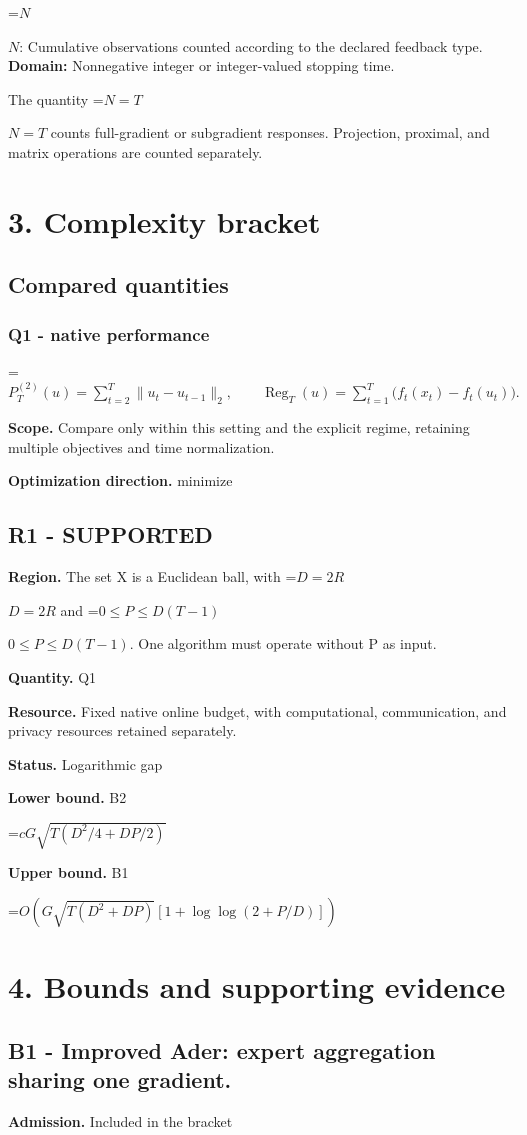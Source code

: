 \documentclass[10pt,a4paper]{article}
\newcommand{\AtlasMath}[1]{\par\begingroup\centering\setbox0=\hbox{$\displaystyle #1$}\ifdim\wd0>1.4\linewidth\typeout{ATLAS WIDE FORMULA: \the\wd0}\fi\ifdim\wd0>\linewidth\resizebox{\linewidth}{!}{\box0}\else\box0\fi\par\endgroup}
\newcommand{\AtlasInlineMath}[1]{\begingroup\setbox0=\hbox{$#1$}\ifdim\wd0>.4\linewidth\endgroup\AtlasMath{#1}\else\endgroup$#1$\fi}
\begin{document}
\AtlasInlineMath{N}: Cumulative observations counted according to the declared feedback type. \textbf{Domain:} Nonnegative integer or integer-valued stopping time.

The quantity \AtlasInlineMath{N=T} counts full-gradient or subgradient responses. Projection, proximal, and matrix operations are counted separately.

\section{3. Complexity bracket}
\subsection{Compared quantities}
\subsubsection{Q1 - native performance}
\AtlasMath{P_T^{(2)}(u)=\sum_{t=2}^{T}\|u_t-u_{t-1}\|_2,\qquad \operatorname{Reg}_T(u)=\sum_{t=1}^{T}\bigl(f_t(x_t)-f_t(u_t)\bigr).}
\textbf{Scope.} Compare only within this setting and the explicit regime, retaining multiple objectives and time normalization.

\textbf{Optimization direction.} minimize

\subsection{R1 - SUPPORTED}
\textbf{Region.} The set X is a Euclidean ball, with \AtlasInlineMath{D=2R} and \AtlasInlineMath{0\le P\le D(T-1)}. One algorithm must operate without P as input.

\textbf{Quantity.} Q1

\textbf{Resource.} Fixed native online budget, with computational, communication, and privacy resources retained separately.

\textbf{Status.} Logarithmic gap

\textbf{Lower bound.} B2

\AtlasMath{cG\sqrt{T(D^2/4+DP/2)}}
\textbf{Upper bound.} B1

\AtlasMath{O(G\sqrt{T(D^2+DP)}[1+\log\log(2+P/D)])}
\section{4. Bounds and supporting evidence}
\subsection{B1 - Improved Ader: expert aggregation sharing one gradient.}
\textbf{Admission.} Included in the bracket
\end{document}
